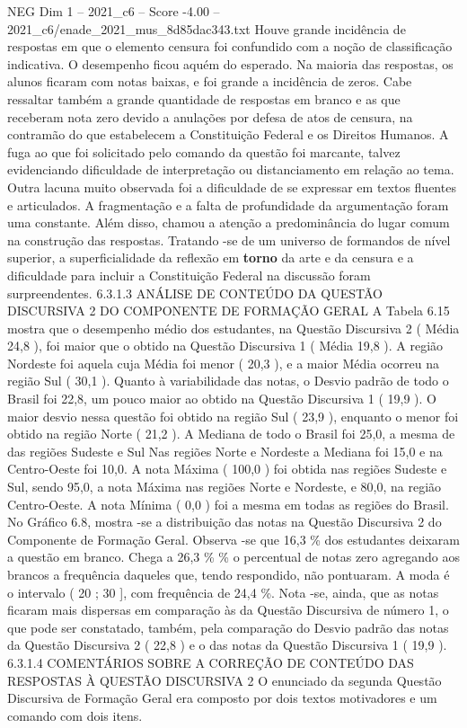 \begin{textsample}{NEG Dim 1 – 2021\_c6 – Score -4.00 – 2021\_c6/enade\_2021\_mus\_8d85dac343.txt}
Houve grande incidência de respostas em que o elemento censura foi confundido com a noção de classificação indicativa.
O desempenho ficou aquém do esperado.
Na maioria das respostas, os alunos ficaram com notas baixas, e foi grande a incidência de zeros.
Cabe ressaltar também a grande quantidade de respostas em branco e as que receberam nota zero devido a anulações por defesa de atos de censura, na contramão do que estabelecem a Constituição Federal e os Direitos Humanos.
A fuga ao que foi solicitado pelo comando da questão foi marcante, talvez evidenciando dificuldade de interpretação ou distanciamento em relação ao tema.
Outra lacuna muito observada foi a dificuldade de se expressar em textos fluentes e articulados.
A fragmentação e a falta de profundidade da argumentação foram uma constante.
Além disso, chamou a atenção a predominância do lugar comum na construção das respostas.
Tratando -se de um universo de formandos de nível superior, a superficialidade da reflexão em \textbf{torno} da arte e da censura e a dificuldade para incluir a Constituição Federal na discussão foram surpreendentes. 6.3.1.3 ANÁLISE DE CONTEÚDO DA QUESTÃO DISCURSIVA 2 DO COMPONENTE DE FORMAÇÃO GERAL A Tabela 6.15 mostra que o desempenho médio dos estudantes, na Questão Discursiva 2 ( Média 24,8 ), foi maior que o obtido na Questão Discursiva 1 ( Média 19,8 ).
A região Nordeste foi aquela cuja Média foi menor ( 20,3 ), e a maior Média ocorreu na região Sul ( 30,1 ).
Quanto à variabilidade das notas, o Desvio padrão de todo o Brasil foi 22,8, um pouco maior ao obtido na Questão Discursiva 1 ( 19,9 ).
O maior desvio nessa questão foi obtido na região Sul ( 23,9 ), enquanto o menor foi obtido na região Norte ( 21,2 ).
A Mediana de todo o Brasil foi 25,0, a mesma de das regiões Sudeste e Sul Nas regiões Norte e Nordeste a Mediana foi 15,0 e na Centro-Oeste foi 10,0.
A nota Máxima ( 100,0 ) foi obtida nas regiões Sudeste e Sul, sendo 95,0, a nota Máxima nas regiões Norte e Nordeste, e 80,0, na região Centro-Oeste.
A nota Mínima ( 0,0 ) foi a mesma em todas as regiões do Brasil.
No Gráfico 6.8, mostra -se a distribuição das notas na Questão Discursiva 2 do Componente de Formação Geral.
Observa -se que 16,3 \% dos estudantes deixaram a questão em branco.
Chega a 26,3 \% \% o percentual de notas zero agregando aos brancos a frequência daqueles que, tendo respondido, não pontuaram.
A moda é o intervalo ( 20 ; 30 ], com frequência de 24,4 \%.
Nota -se, ainda, que as notas ficaram mais dispersas em comparação às da Questão Discursiva de número 1, o que pode ser constatado, também, pela comparação do Desvio padrão das notas da Questão Discursiva 2 ( 22,8 ) e o das notas da Questão Discursiva 1 ( 19,9 ). 6.3.1.4 COMENTÁRIOS SOBRE A CORREÇÃO DE CONTEÚDO DAS RESPOSTAS À QUESTÃO DISCURSIVA 2 O enunciado da segunda Questão Discursiva de Formação Geral era composto por dois textos motivadores e um comando com dois itens.

\end{textsample}
